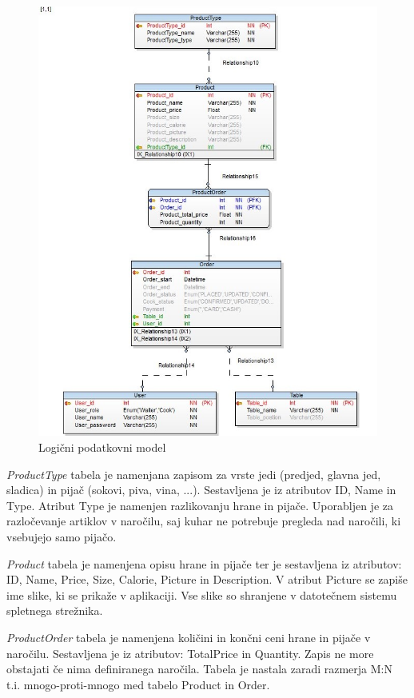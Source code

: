 \documentclass[a4paper, 12pt]{book}
\begin{document}
\begin{figure}[!htb]
\begin{center}
\includegraphics[width=12.5cm]{Database_physical}
\caption{Logični podatkovni model}
\label{Database_physical}
\end{center}
\end{figure}

\textit{ProductType} tabela je namenjana zapisom za vrste jedi (predjed, glavna jed, sladica) in pijač (sokovi, piva, vina, ...). Sestavljena je iz atributov ID, Name in Type. Atribut Type je namenjen razlikovanju hrane in pijače. Uporabljen je za razločevanje artiklov v naročilu, saj kuhar ne potrebuje pregleda nad naročili, ki vsebujejo samo pijačo. 

\textit{Product} tabela je namenjena opisu hrane in pijače ter je sestavljena iz atributov: ID, Name, Price, Size, Calorie, Picture in Description.  V atribut Picture se zapiše ime slike, ki se prikaže v aplikaciji. Vse slike so shranjene v datotečnem sistemu spletnega strežnika.

\textit{ProductOrder} tabela je namenjena količini in končni ceni hrane in pijače v naročilu. Sestavljena je iz atributov: TotalPrice in Quantity. Zapis ne more obstajati če nima definiranega naročila. Tabela je nastala zaradi razmerja M:N t.i. mnogo-proti-mnogo med tabelo Product in Order.
\end{document}
